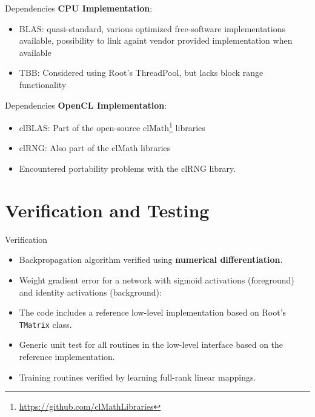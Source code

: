 \documentclass{beamer}
\begin{document}
\begin{frame}{Dependencies}
  \textbf{CPU Implementation}:
  \begin{itemize}
    \item BLAS: quasi-standard, various optimized free-software
      implementations available, possibility to link againt vendor provided
      implementation when available
    \item TBB: Considered using Root's ThreadPool, but lacks block range
      functionality
  \end{itemize}
\end{frame}
\begin{frame}{Dependencies}
  \textbf{OpenCL Implementation}:
  \begin{itemize}
    \item clBLAS: Part of the open-source clMath\footnote{\url{https://github.com/clMathLibraries}} libraries
    \item clRNG: Also part of the clMath libraries
    \item Encountered portability problems with the clRNG library.
  \end{itemize}
\end{frame}

\section{Verification and Testing}

\begin{frame}{Verification}
\begin{itemize}
  \item Backpropagation algorithm verified using \textbf{numerical differentiation}.
  \item Weight gradient error for a network with sigmoid activations (foreground)
    and identity activations (background):
  \item The code includes a reference low-level implementation based on
    Root's \texttt{TMatrix} class.
  \item Generic unit test for all routines in the low-level interface based
    on the reference implementation.
  \item Training routines verified by learning full-rank linear mappings.
    \end{itemize}
\end{frame}
\end{document}
